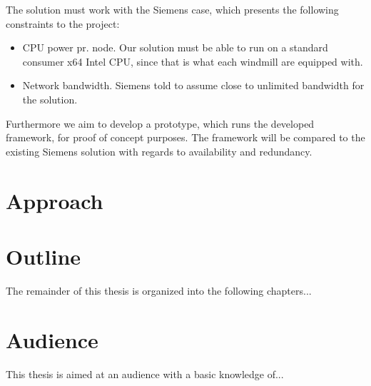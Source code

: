 The solution must work with the Siemens case, which presents the following constraints to the project:
\begin{itemize} 
	\item CPU power pr. node. Our solution must be able to run on a standard consumer x64 Intel CPU, since that is what each windmill are equipped with.
	\item Network bandwidth. Siemens told to assume close to unlimited bandwidth for the solution. 
\end{itemize}

Furthermore we aim to develop a prototype, which runs the developed framework, for proof of concept purposes. The framework will be compared to the existing Siemens solution with regards to availability and redundancy. 





%
%
%

\section{Approach}

\section{Outline}
The remainder of this thesis is organized into the following chapters...

\section{Audience}
This thesis is aimed at an audience with a basic knowledge of...
